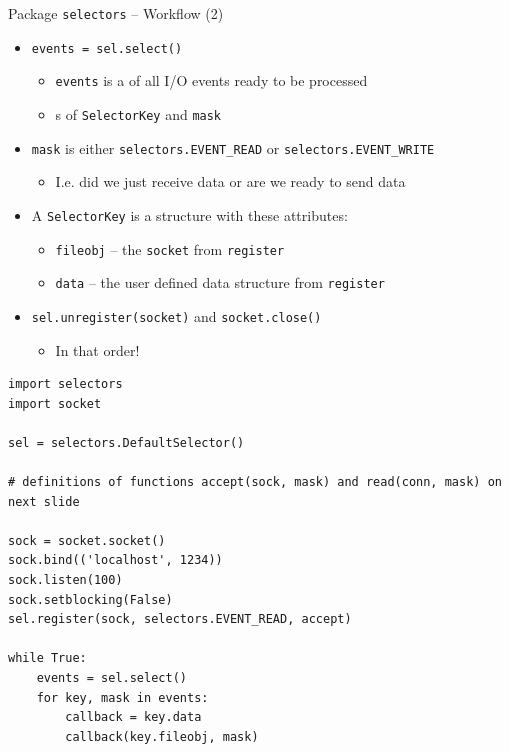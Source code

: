\begin{frame}{Package \texttt{selectors} -- Workflow (2)}
%
\begin{itemize}
\item \texttt{events = sel.select()}
	\begin{itemize}
	\item \texttt{events} is a  of all I/O events ready to be processed
	\item {}s of \texttt{SelectorKey} and \texttt{mask}
	\end{itemize}
\pause
\item \texttt{mask} is either \texttt{selectors.EVENT\_READ} or \texttt{selectors.EVENT\_WRITE}
	\begin{itemize}
	\item I.\;e. did we just receive data or are we ready to send data
	\end{itemize}
\pause
\item A \texttt{SelectorKey} is a structure with these attributes:
	\begin{itemize}
	\item \texttt{fileobj} -- the \texttt{socket} from \texttt{register}
	\item \texttt{data} -- the user defined data structure from \texttt{register}
	\end{itemize}
\pause
\item \texttt{sel.unregister(socket)} and \texttt{socket.close()}
	\begin{itemize}
	\item In that order!
	\end{itemize}
\end{itemize}
%
\end{frame}


\begin{frame}[fragile]
%
\begin{codebox}
\begin{verbatim}
import selectors
import socket

sel = selectors.DefaultSelector()

# definitions of functions accept(sock, mask) and read(conn, mask) on next slide

sock = socket.socket()
sock.bind(('localhost', 1234))
sock.listen(100)
sock.setblocking(False)
sel.register(sock, selectors.EVENT_READ, accept)

while True:
    events = sel.select()
    for key, mask in events:
        callback = key.data
        callback(key.fileobj, mask)
\end{verbatim}
\end{codebox}
%
\end{frame}


